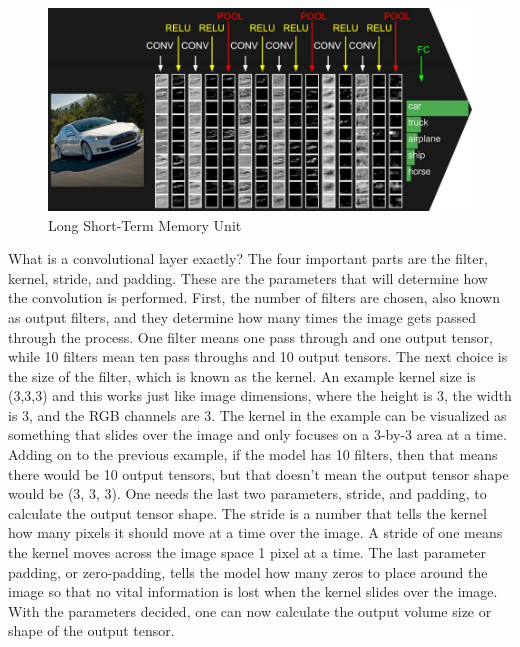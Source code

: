 \documentclass[12pt]{article}
\begin{document}
                \begin{figure}[ht]
            
                    \begin{center}
    
                        \includegraphics[scale=0.65]{cnn-overview.png}
                        \caption{Long Short-Term Memory Unit \cite{cs231n2023}}
                        \label{cnn-overview-fig}
            
                    \end{center}
                    
                \end{figure}
    

                What is a convolutional layer exactly? The four important parts are the filter, kernel, stride, and padding. 
                These are the parameters that will determine how the convolution is performed. 
                First, the number of filters are chosen, also known as output filters, 
                and they determine how many times the image gets passed through the process. 
                One filter means one pass through and one output tensor, while 10 filters mean ten pass throughs and 10 output tensors. 
                The next choice is the size of the filter, which is known as the kernel. 
                An example kernel size is (3,3,3) and this works just like image dimensions, 
                where the height is 3, the width is 3, and the RGB channels are 3. 
                The kernel in the example can be visualized as something that slides over the image 
                and only focuses on a 3-by-3 area at a time. Adding on to the previous example, if the model has 10 filters, 
                then that means there would be 10 output tensors, but that doesn’t mean the output tensor shape would be (3, 3, 3). 
                One needs the last two parameters, stride, and padding, to calculate the output tensor shape. 
                The stride is a number that tells the kernel how many pixels it should move at a time over the image. 
                A stride of one means the kernel moves across the image space 1 pixel at a time. 
                The last parameter padding, or zero-padding, tells the model how many zeros to place around the image 
                so that no vital information is lost when the kernel slides over the image. With the parameters decided, 
                one can now calculate the output volume size or shape of the output tensor.
                
\end{document}
